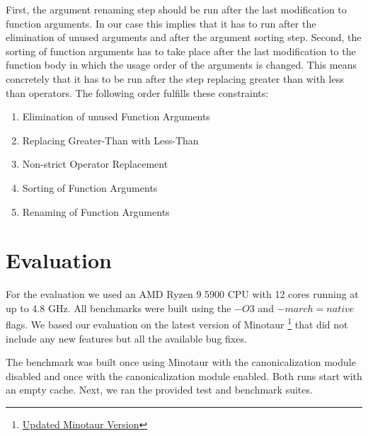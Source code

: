 	First, the argument renaming step should be run after the last modification to function arguments.
	In our case this implies that it has to run after the elimination of unused arguments and after the argument sorting step.
	Second, the sorting of function arguments has to take place after the last modification to the function body in which the usage order of the arguments is changed.
	This means concretely that it has to be run after the step replacing greater than with less than operators.
	The following order fulfills these constraints:

	\begin{enumerate}[noitemsep, topsep=0pt, leftmargin=*]
		\item Elimination of unused Function Arguments
		\item Replacing Greater-Than with Less-Than
		\item Non-strict Operator Replacement
		\item Sorting of Function Arguments
		\item Renaming of Function Arguments
	\end{enumerate}
	

	\section{Evaluation}
	For the evaluation we used an AMD Ryzen 9 5900 CPU with 12 cores running at up to 4.8 GHz.
	All benchmarks were built using the $-O3$ and $-march=native$ flags.
	We based our evaluation on the latest version of Minotaur \footnote{\href{https://github.com/minotaur-toolkit/minotaur/tree/d372e6dd903045fcb0461a74633634470f6b157c}{Updated Minotaur Version}} that did not include any new features but all the available bug fixes.

	The benchmark was built once using Minotaur with the canonicalization module disabled and once with the canonicalization module enabled.
	Both runs start with an empty cache.
	Next, we ran the provided test and benchmark suites.

